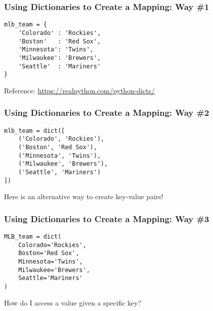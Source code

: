 \documentclass[14pt,aspectratio=169]{beamer}
\begin{document}
%
\begin{frame}[fragile]
  \frametitle{Using Dictionaries to Create a Mapping: Way \#1}
  \hspace*{.1in}
  \begin{minipage}{6in}
    \vspace*{.25in}
    \begin{verbatim}
mlb_team = {
    'Colorado' : 'Rockies',
    'Boston'   : 'Red Sox',
    'Minnesota': 'Twins',
    'Milwaukee': 'Brewers',
    'Seattle'  : 'Mariners'
}
    \end{verbatim}
  \end{minipage}
  \vspace*{.025in}
  \begin{center}
    \normalsize \noindent Reference: \url{https://realpython.com/python-dicts/} \\
  \end{center}
\end{frame}

%
\begin{frame}[fragile]
  \frametitle{Using Dictionaries to Create a Mapping: Way \#2}
  \hspace*{.1in}
  \begin{minipage}{6in}
    \vspace*{.25in}
    \begin{verbatim}
mlb_team = dict([
    ('Colorado', 'Rockies'),
    ('Boston', 'Red Sox'),
    ('Minnesota', 'Twins'),
    ('Milwaukee', 'Brewers'),
    ('Seattle', 'Mariners')
])
    \end{verbatim}
  \end{minipage}
  \vspace*{.025in}
  \begin{center}
    \normalsize \noindent Here is an alternative way to create key-value pairs! \\
  \end{center}
\end{frame}

%
\begin{frame}[fragile]
  \frametitle{Using Dictionaries to Create a Mapping: Way \#3}
  \hspace*{.1in}
  \begin{minipage}{6in}
    \vspace*{.25in}
    \begin{verbatim}
MLB_team = dict(
    Colorado='Rockies',
    Boston='Red Sox',
    Minnesota='Twins',
    Milwaukee='Brewers',
    Seattle='Mariners'
)
    \end{verbatim}
  \end{minipage}
  \vspace*{.025in}
  \begin{center}
    \normalsize \noindent How do I access a value given a specific key? \\
  \end{center}
\end{frame}
\end{document}
